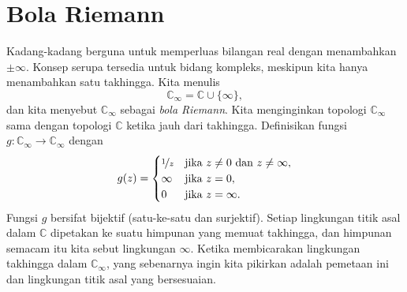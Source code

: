 \documentclass[12pt,openany]{book}
\newcommand{\C}{{\mathbb{C}}}
\newcommand{\myindex}[1]{#1\index{#1}}
\theoremstyle{plain}
\theoremstyle{remark}
\theoremstyle{definition}
\theoremstyle{exercise}
\theoremstyle{example}
\begin{document}

\section{Bola Riemann}

Kadang-kadang berguna untuk memperluas bilangan real dengan menambahkan $\pm \infty$.
Konsep serupa tersedia untuk bidang kompleks, meskipun
kita hanya menambahkan satu takhingga.  Kita menulis
%
%
\begin{equation*}
\C_{\infty} = \C \cup \{ \infty \} ,
\end{equation*}
dan kita menyebut $\C_{\infty}$ sebagai \emph{\myindex{bola Riemann}}.
Kita menginginkan topologi $\C_\infty$ sama dengan topologi $\C$
ketika jauh dari takhingga.
Definisikan fungsi $g \colon \C_\infty \to \C_\infty$ dengan
\begin{equation*}
g(z) =
\begin{cases}
\nicefrac{1}{z} & \text{jika } z \neq 0 \text{ dan } z \neq \infty, \\
\infty & \text{jika } z = 0, \\
0 & \text{jika } z = \infty.
\end{cases}
\end{equation*}
Fungsi $g$ bersifat bijektif (satu-ke-satu dan surjektif).
Setiap lingkungan titik asal dalam $\C$ dipetakan ke suatu himpunan yang
memuat takhingga, dan himpunan semacam itu kita sebut lingkungan
$\infty$.  Ketika membicarakan lingkungan
takhingga dalam $\C_{\infty}$, yang sebenarnya ingin kita pikirkan adalah pemetaan ini
dan lingkungan titik asal yang bersesuaian.
\end{document}
